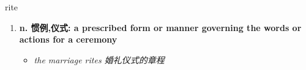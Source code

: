 
\begin{frame}
{\huge rite}
\begin{center}
\begin{enumerate}\Large
  \item \textbf{n. 惯例,仪式: a prescribed form or manner governing the words or actions for a ceremony}
  \begin{itemize}
    \item \em{\Large{the marriage rites 婚礼仪式的章程}}
  \end{itemize}
\end{enumerate}
\end{center}
\end{frame}
